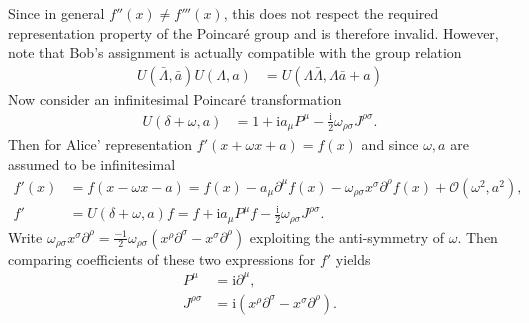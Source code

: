 \documentclass[english, parskip=full]{scrartcl}
\newcommand{\kla}{}
\renewcommand{\i}{\text{i}}
\renewcommand{\tilde}{\bar}
\begin{document}
Since in general $f''(x) \neq f'''(x)$, this does not respect the required representation property of the Poincar\'e group and is therefore invalid.
However, note that Bob's assignment is actually compatible with the group relation
\begin{align}
U(\tilde{\Lambda}, \tilde{a}) U(\Lambda, a) &= U(\Lambda\tilde{\Lambda}, \Lambda \tilde{a} + a)
\end{align} 
Now consider an infinitesimal Poincar\'e transformation
\begin{align}
U(\delta + \omega, a) &= 1 + \i a_\mu P^\mu - \frac{\i}{2}\omega_{\rho\sigma} J^{\rho\sigma}.
\end{align}
Then for Alice' representation $f'(x + \omega x + a) = f(x)$ and since $\omega, a$ are assumed to be infinitesimal
\begin{align}
f'(x) &= f(x - \omega x - a) = f(x) - a_\mu \partial^\mu f(x) - \omega_{\rho\sigma} x^\sigma \partial^\rho f(x) + \mathcal{O}(\omega^2, a^2),\\
f' &= U(\delta + \omega, a) f = f + \i a_\mu P^\mu f - \frac{\i}{2}\omega_{\rho\sigma} J^{\rho\sigma}.
\end{align}
Write $\omega_{\rho\sigma} x^\sigma \partial^\rho = \frac{-1}{2} \omega_{\rho\sigma} \kla\left( x^\rho \partial^\sigma - x^\sigma \partial^\rho \right)$ exploiting the anti-symmetry of $\omega$. 
Then comparing coefficients of these two expressions for $f'$ yields
\begin{align}
P^\mu &= \i\partial^\mu,\\
J^{\rho\sigma} &= \i \kla\left( x^\rho \partial^\sigma - x^\sigma \partial^\rho \right).
\end{align}
\end{document}
